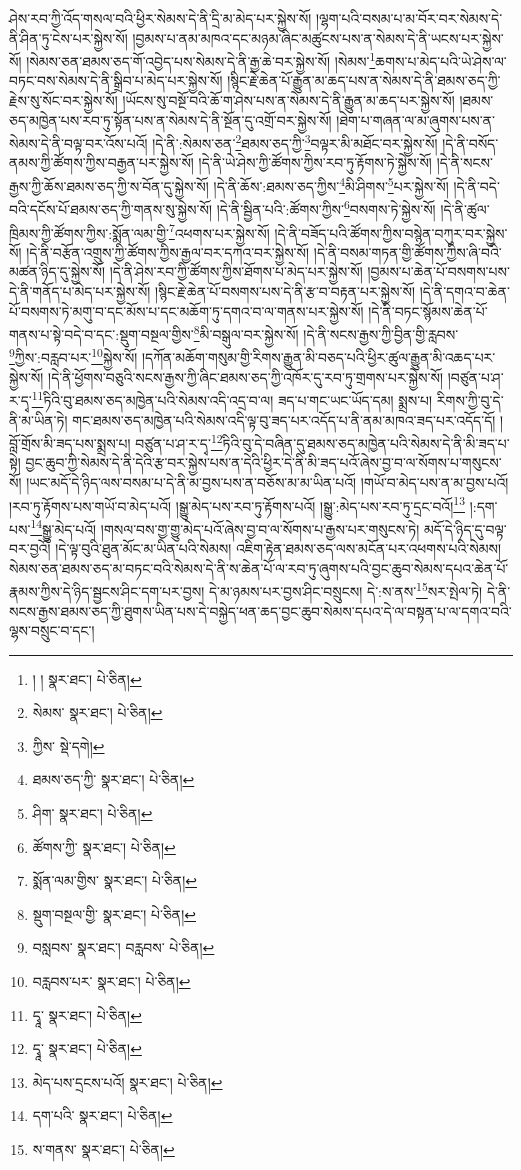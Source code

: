 ཤེས་རབ་ཀྱི་འོད་གསལ་བའི་ཕྱིར་སེམས་དེ་ནི་དྲི་མ་མེད་པར་སྐྱེས་སོ། །ལྷག་པའི་བསམ་པ་མ་བོར་བར་སེམས་དེ་ནི་ཤིན་ཏུ་ངེས་པར་སྐྱེས་སོ། །བྱམས་པ་ནམ་མཁའ་དང་མཉམ་ཞིང་མཚུངས་པས་ན་སེམས་དེ་ནི་ཡངས་པར་སྐྱེས་སོ། །སེམས་ཅན་ཐམས་ཅད་གོ་འབྱེད་པས་སེམས་དེ་ནི་རྒྱ་ཆེ་བར་སྐྱེས་སོ། །སེམས་\footnote{། །  སྣར་ཐང་།  པེ་ཅིན། }ཆགས་པ་མེད་པའི་ཡེ་ཤེས་ལ་བཏང་བས་སེམས་དེ་ནི་སྒྲིབ་པ་མེད་པར་སྐྱེས་སོ། །སྙིང་རྗེ་ཆེན་པོ་རྒྱུན་མ་ཆད་པས་ན་སེམས་དེ་ནི་ཐམས་ཅད་ཀྱི་རྗེས་སུ་སོང་བར་སྐྱེས་སོ། །ཡོངས་སུ་བསྔོ་བའི་ཆོ་ག་ཤེས་པས་ན་སེམས་དེ་ནི་རྒྱུན་མ་ཆད་པར་སྐྱེས་སོ། །ཐམས་ཅད་མཁྱེན་པས་རབ་ཏུ་སྟོན་པས་ན་སེམས་དེ་ནི་སྔོན་དུ་འགྲོ་བར་སྐྱེས་སོ། །ཐེག་པ་གཞན་ལ་མ་ཞུགས་པས་ན་སེམས་དེ་ནི་བལྟ་བར་འོས་པའོ། །དེ་ནི་:སེམས་ཅན་\footnote{སེམས་  སྣར་ཐང་།  པེ་ཅིན། }ཐམས་ཅད་ཀྱི་\footnote{ཀྱིས་  སྡེ་དགེ། }བལྟར་མི་མཐོང་བར་སྐྱེས་སོ། །དེ་ནི་བསོད་ནམས་ཀྱི་ཚོགས་ཀྱིས་བརྒྱན་པར་སྐྱེས་སོ། །དེ་ནི་ཡེ་ཤེས་ཀྱི་ཚོགས་ཀྱིས་རབ་ཏུ་རྟོགས་ཏེ་སྐྱེས་སོ། །དེ་ནི་སངས་རྒྱས་ཀྱི་ཆོས་ཐམས་ཅད་ཀྱི་ས་བོན་དུ་སྐྱེས་སོ། །དེ་ནི་ཆོས་:ཐམས་ཅད་ཀྱིས་\footnote{ཐམས་ཅད་ཀྱི་  སྣར་ཐང་།  པེ་ཅིན། }མི་ཤིགས་\footnote{ཤིག་  སྣར་ཐང་།  པེ་ཅིན། }པར་སྐྱེས་སོ། །དེ་ནི་བདེ་བའི་དངོས་པོ་ཐམས་ཅད་ཀྱི་གནས་སུ་སྐྱེས་སོ། །དེ་ནི་སྦྱིན་པའི་:ཚོགས་ཀྱིས་\footnote{ཚོགས་ཀྱི་  སྣར་ཐང་།  པེ་ཅིན། }བསགས་ཏེ་སྐྱེས་སོ། །དེ་ནི་ཚུལ་ཁྲིམས་ཀྱི་ཚོགས་ཀྱིས་:སྨོན་ལམ་གྱི་\footnote{སྨོན་ལམ་གྱིས་  སྣར་ཐང་།  པེ་ཅིན། }འཕགས་པར་སྐྱེས་སོ། །དེ་ནི་བཟོད་པའི་ཚོགས་ཀྱིས་བསྙེན་བཀུར་བར་སྐྱེས་སོ། །དེ་ནི་བརྩོན་འགྲུས་ཀྱི་ཚོགས་ཀྱིས་རྒྱལ་བར་དཀའ་བར་སྐྱེས་སོ། །དེ་ནི་བསམ་གཏན་གྱི་ཚོགས་ཀྱིས་ཞི་བའི་མཚན་ཉིད་དུ་སྐྱེས་སོ། །དེ་ནི་ཤེས་རབ་ཀྱི་ཚོགས་ཀྱིས་ཐོགས་པ་མེད་པར་སྐྱེས་སོ། །བྱམས་པ་ཆེན་པོ་བསགས་པས་དེ་ནི་གནོད་པ་མེད་པར་སྐྱེས་སོ། །སྙིང་རྗེ་ཆེན་པོ་བསགས་པས་དེ་ནི་རྩ་བ་བརྟན་པར་སྐྱེས་སོ། །དེ་ནི་དགའ་བ་ཆེན་པོ་བསགས་ཏེ་མགུ་བ་དང་མོས་པ་དང་མཆོག་ཏུ་དགའ་བ་ལ་གནས་པར་སྐྱེས་སོ། །དེ་ནི་བཏང་སྙོམས་ཆེན་པོ་གནས་པ་སྟེ་བདེ་བ་དང་:སྡུག་བསྔལ་གྱིས་\footnote{སྡུག་བསྔལ་གྱི་  སྣར་ཐང་།  པེ་ཅིན། }མི་བསྒུལ་བར་སྐྱེས་སོ། །དེ་ནི་སངས་རྒྱས་ཀྱི་བྱིན་གྱི་རླབས་\footnote{བསླབས་  སྣར་ཐང་། བརླབས་  པེ་ཅིན། }ཀྱིས་:བརླབ་པར་\footnote{བརླབས་པར་  སྣར་ཐང་།  པེ་ཅིན། }སྐྱེས་སོ། །དཀོན་མཆོག་གསུམ་གྱི་རིགས་རྒྱུན་མི་བཅད་པའི་ཕྱིར་ཚུལ་རྒྱུན་མི་འཆད་པར་སྐྱེས་སོ། །དེ་ནི་ཕྱོགས་བཅུའི་སངས་རྒྱས་ཀྱི་ཞིང་ཐམས་ཅད་ཀྱི་འཁོར་དུ་རབ་ཏུ་གྲགས་པར་སྐྱེས་སོ། །བཙུན་པ་ཤ་ར་དྭ་\footnote{དྭཱ་  སྣར་ཐང་།  པེ་ཅིན། }ཏིའི་བུ་ཐམས་ཅད་མཁྱེན་པའི་སེམས་འདི་འདྲ་བ་ལ། ཟད་པ་གང་ཡང་ཡོད་དམ། སྨྲས་པ། རིགས་ཀྱི་བུ་དེ་ནི་མ་ཡིན་ཏེ། གང་ཐམས་ཅད་མཁྱེན་པའི་སེམས་འདི་ལྟ་བུ་ཟད་པར་འདོད་པ་ནི་ནམ་མཁའ་ཟད་པར་འདོད་དོ། །བློ་གྲོས་མི་ཟད་པས་སྨྲས་པ། བཙུན་པ་ཤ་ར་དྭ་\footnote{དྭཱ་  སྣར་ཐང་།  པེ་ཅིན། }ཏིའི་བུ་དེ་བཞིན་དུ་ཐམས་ཅད་མཁྱེན་པའི་སེམས་དེ་ནི་མི་ཟད་པ་སྟེ། བྱང་ཆུབ་ཀྱི་སེམས་དེ་ནི་དེའི་རྩ་བར་སྐྱེས་པས་ན་དེའི་ཕྱིར་དེ་ནི་མི་ཟད་པའོ་ཞེས་བྱ་བ་ལ་སོགས་པ་གསུངས་སོ། །ཡང་མདོ་དེ་ཉིད་ལས་བསམ་པ་དེ་ནི་མ་བྱས་པས་ན་བཅོས་མ་མ་ཡིན་པའོ། །གཡོ་བ་མེད་པས་ན་མ་བྱས་པའོ། །རབ་ཏུ་རྟོགས་པས་གཡོ་བ་མེད་པའོ། །སྒྱུ་མེད་པས་རབ་ཏུ་རྟོགས་པའོ། །སྒྱུ་:མེད་པས་རབ་ཏུ་དྲང་བའོ།\footnote{མེད་པས་དྲངས་པའོ།  སྣར་ཐང་།  པེ་ཅིན། } །:དག་པས་\footnote{དག་པའི་  སྣར་ཐང་།  པེ་ཅིན། }སྒྱུ་མེད་པའོ། །གསལ་བས་གྱ་གྱུ་མེད་པའོ་ཞེས་བྱ་བ་ལ་སོགས་པ་རྒྱས་པར་གསུངས་ཏེ། མདོ་དེ་ཉིད་དུ་བལྟ་བར་བྱའོ། །དེ་ལྟ་བུའི་ཐུན་མོང་མ་ཡིན་པའི་སེམས། འཇིག་རྟེན་ཐམས་ཅད་ལས་མངོན་པར་འཕགས་པའི་སེམས། སེམས་ཅན་ཐམས་ཅད་མ་བཏང་བའི་སེམས་དེ་ནི་ས་ཆེན་པོ་ལ་རབ་ཏུ་ཞུགས་པའི་བྱང་ཆུབ་སེམས་དཔའ་ཆེན་པོ་རྣམས་ཀྱིས་དེ་ཉིད་སྦྱངས་ཤིང་དག་པར་བྱས། དེ་མ་ཉམས་པར་བྱས་ཤིང་བསྲུངས། དེ་:ས་ནས་\footnote{ས་གནས་  སྣར་ཐང་།  པེ་ཅིན། }སར་སྤེལ་ཏེ། དེ་ནི་སངས་རྒྱས་ཐམས་ཅད་ཀྱི་ཐུགས་ཡིན་པས་དེ་བསྐྱེད་ཕན་ཆད་བྱང་ཆུབ་སེམས་དཔའ་དེ་ལ་བསྟན་པ་ལ་དགའ་བའི་ལྷས་བསྲུང་བ་དང་། 